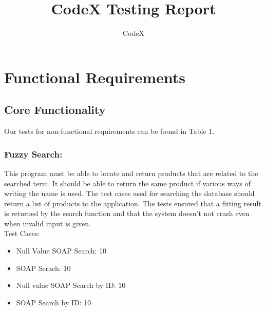 \documentclass[11pt]{article}
\author{CodeX}
\title{CodeX Testing Report}
\begin{document}
	\setlength{\parskip}{6pt}
	
	
	
	\tableofcontents
	
	\newpage
	
	\section{Functional Requirements}
	\subsection{Core Functionality}
		Our tests for non-functional requirements can be found in Table 1. 
	\subsubsection{Fuzzy Search:}

	This program must be able to locate and return products that are related to the searched term. It should be able to return the same product if various ways of writing the name is used.
	The test cases used for searching the database should return a list of products to the application. The tests ensured that a fitting result is returned by the search function and that the system doesn't not crash even when invalid input is given.\\

	Test Cases:
      \begin{itemize}
      \item Null Value SOAP Search: 10
      \item SOAP Serach: 10
      \item Null value SOAP Search by ID: 10
      \item SOAP Search by ID: 10
      \end{itemize}
	
\end{document}
